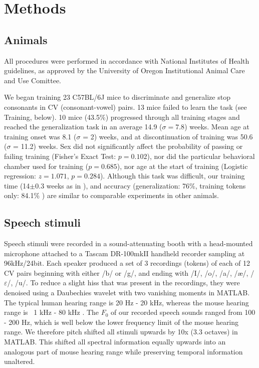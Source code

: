 \section{\Large Methods}

\subsection{Animals}

All procedures were performed in accordance with National Institutes of Health guidelines, as approved by the University of Oregon Institutional Animal Care and Use Comittee.

We began training 23 C57BL/6J mice to discriminate and generalize stop consonants in CV (consonant-vowel) pairs. 13 mice failed to learn the task (see Training, below). 10 mice (43.5\%) progressed through all training stages and reached the generalization task in an average 14.9 ($\sigma = 7.8$) weeks. Mean age at training onset was 8.1 ($\sigma$ = 2) weeks, and at discontinuation of training was 50.6 ($\sigma$ = 11.2) weeks. Sex did not significantly affect the probability of passing or failing training (Fisher's Exact Test: $p = 0.102$), nor did the particular behavioral chamber used for training ($p = 0.685$), nor age at the start of training (Logistic regression: $z = 1.071$, $p=0.284$). Although this task was difficult, our training time (14$\pm 0.3$ weeks as in \cite{Engineer2015}), and accuracy (generalization: 76\%\cite{Kluender1987}, training tokens only: 84.1\% \cite{Engineer2015}) are similar to comparable experiments in other animals.

\subsection{Speech stimuli}

Speech stimuli were recorded in a sound-attenuating booth with a head-mounted microphone attached to a Tascam DR-100mkII handheld recorder sampling at 96kHz/24bit. Each speaker produced a set of 3 recordings (tokens) of each of 12 CV pairs beginning with either /b/ or /g/, and ending with /I/, /o/, /a/, /\ae/, /$\varepsilon$/, /u/. To reduce a slight hiss that was present in the recordings, they were denoised using a Daubechies wavelet with two vanishing moments in MATLAB. The typical human hearing range is 20 Hz - 20 kHz, whereas the mouse hearing range is ~1 kHz - 80 kHz \cite{Radziwon2009}. The $F_0$ of our recorded speech sounds ranged from 100 - 200 Hz, which is well below the lower frequency limit of the mouse hearing range. We therefore pitch shifted all stimuli upwards by 10x (3.3 octaves) in MATLAB\cite{Mathworks}. This shifted all spectral information equally upwards into an analogous part of mouse hearing range while preserving temporal information unaltered.

